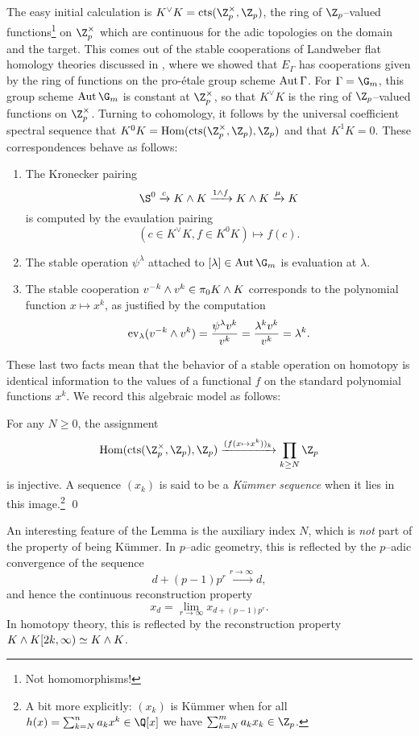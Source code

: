 The easy initial calculation is $K^\vee K = \cts(\Z_p^\times, \Z_p)$, the ring of $\Z_p$--valued functions\footnote{Not homomorphisms!} on $\Z_p^\times$ which are continuous for the adic topologies on the domain and the target.  This comes out of the stable cooperations of Landweber flat homology theories discussed in , where we showed that $E_\Gamma$ has cooperations given by the ring of functions on the pro-\'etale group scheme $\operatorname{Aut} \Gamma$.  For $\Gamma = \G_m$, this group scheme $\Aut \G_m$ is constant at $\Z_p^\times$, so that $K^\vee K$ is the ring of $\Z_p$--valued functions on $\Z_p^\times$.  Turning to cohomology, it follows by the universal coefficient spectral sequence that $K^0 K = \Hom(\cts(\Z_p^\times, \Z_p), \Z_p)$ and that $K^1 K = 0$.  These correspondences behave as follows:
\begin{enumerate}
    \item The Kronecker pairing \[\S^0 \xrightarrow{c} K \sm K \xrightarrow{1 \sm f} K \sm K \xrightarrow{\mu} K\] is computed by the evaulation pairing \[(c \in K^\vee K, f \in K^0 K) \mapsto f(c).\]
    \item The stable operation $\psi^\lambda$ attached to $[\lambda] \in \Aut \G_m$ is evaluation at $\lambda$.
    \item The stable cooperation $v^{-k} \wedge v^k \in \pi_0 K \wedge K$ corresponds to the polynomial function $x \mapsto x^k$, as justified by the computation \[\operatorname{ev}_{\lambda}(v^{-k} \wedge v^k) = \frac{\psi^\lambda v^k}{v^k} = \frac{\lambda^k v^k}{v^k} = \lambda^k.\]
\end{enumerate}

\noindent These last two facts mean that the behavior of a stable operation on homotopy is identical information to the values of a functional $f$ on the standard polynomial functions $x^k$.  We record this algebraic model as follows:
\begin{lemma}
For any $N \ge 0$, the assignment \[\Hom(\cts(\Z_p^\times, \Z_p), \Z_p) \xrightarrow{(f(x \mapsto x^k))_k} \prod_{k \ge N} \Z_p\] is injective.  A sequence $(x_k)$ is said to be a \emph{K\"ummer sequence} when it lies in this image.\footnote{A bit more explicitly: $(x_k)$ is K\"ummer when for all $h(x) = \sum_{k=N}^n a_k x^k \in \Q[x]$ we have $\sum_{k=N}^m a_k x_k \in \Z_p$.} \qed
\end{lemma}

\begin{remark}
An interesting feature of the Lemma is the auxiliary index $N$, which is \emph{not} part of the property of being K\"ummer.  In $p$--adic geometry, this is reflected by the $p$--adic convergence of the sequence \[d + (p-1)p^r \xrightarrow{r \to \infty} d,\] and hence the continuous reconstruction property \[x_d = \lim_{r \to \infty} x_{d + (p-1)p^r}.\]  In homotopy theory, this is reflected by the reconstruction property $K \wedge K[2k, \infty) \simeq K \wedge K$.
\end{remark}

